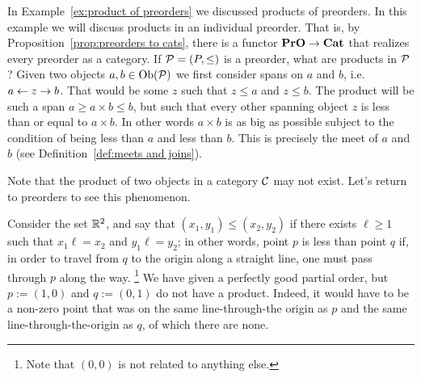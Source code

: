 \documentclass[CT4S-EN-RU]{subfiles}
\begin{document}
\begin{remarkRUS}\label{rem:gateway}
\end{remarkRUS}

\begin{exampleENG}
In Example~\ref{ex:product of preorders} we discussed products of preorders. In this example we will discuss products in an individual preorder. That is, by Proposition~\ref{prop:preorders to cats}, there is a functor ${\mathbf{PrO}}\rightarrow{\mathbf{Cat}}$ that realizes every preorder as a category. If $\mathcal{P}=(P,\leq)$ is a preorder, what are products in $\mathcal{P}$? Given two objects $a,b\in\textnormal{Ob}(\mathcal{P})$ we first consider spans on $a$ and $b$, i.e. $a\leftarrow z\rightarrow b$. That would be some $z$ such that $z\leq a$ and $z\leq b$. The product will be such a span $a\geq a\times b\leq b$, but such that every other spanning object $z$ is less than or equal to $a\times b$. In other words $a\times b$ is as big as possible subject to the condition of being less than $a$ and less than $b$. This is precisely the meet of $a$ and $b$ (see Definition~\ref{def:meets and joins}). 
\end{exampleENG}

\begin{exampleRUS}
\end{exampleRUS}

\begin{exampleENG}\label{ex:products dont exist}
Note that the product of two objects in a category $\mathcal{C}$ may not exist. Let's return to preorders to see this phenomenon.

Consider the set ${\mathbb R}^2$, and say that $(x_1,y_1)\leq (x_2,y_2)$ if there exists $\ell\geq 1$ such that $x_1\ell=x_2$ and $y_1\ell=y_2$; in other words, point $p$ is less than point $q$ if, in order to travel from $q$ to the origin along a straight line, one must pass through $p$ along the way. 
\footnote{Note that $(0,0)$ is not related to anything else.} 
We have given a perfectly good partial order, but $p:=(1,0)$ and $q:=(0,1)$ do not have a product. Indeed, it would have to be a non-zero point that was on the same line-through-the origin as $p$ and the same line-through-the-origin as $q$, of which there are none.
\end{exampleENG}

\begin{exampleRUS}\label{ex:products dont exist}
\end{exampleRUS}
\end{document}
